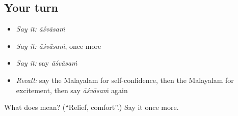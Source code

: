 \subsection*{Your turn}
\begin{itemize}
\raggedright
  \item \emph{Say it:} \emph{āśvāsaṁ}
  \item \emph{Say it:} \emph{āśvāsaṁ}, once more
  \item \emph{Say it:} say \emph{āśvāsaṁ}
  \item \emph{Recall:} say the Malayalam for self-confidence, then the Malayalam for excitement, then say \emph{āśvāsaṁ} again
\end{itemize}

\begin{tcolorbox}[breakable,colback=teal!4,colframe=teal!35!black,title={Before you move on}]
What does  mean? (\textquotedblleft{}Relief, comfort\textquotedblright{}.) Say it once more.
\end{tcolorbox}
